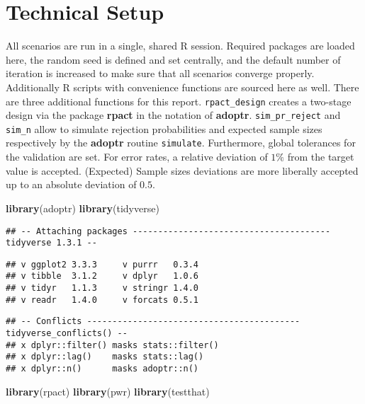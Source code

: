 \documentclass[
]{book}
\newenvironment{Shaded}{\begin{snugshade}}{\end{snugshade}}
\newcommand{\KeywordTok}[1]{\textcolor[rgb]{0.13,0.29,0.53}{\textbf{#1}}}
\newcommand{\NormalTok}[1]{#1}
\begin{document}
\hypertarget{technical-setup}{%
\section{Technical Setup}\label{technical-setup}}

All scenarios are run in a single, shared R session.
Required packages are loaded here,
the random seed is defined and set centrally, and the default number
of iteration is increased to make sure that all scenarios
converge properly.
Additionally R scripts with convenience functions are sourced here as well.
There are three additional functions for this report.
\texttt{rpact\_design} creates a two-stage design via the package \textbf{rpact} \citep{R-rpact}
in the notation of \textbf{adoptr}.
\texttt{sim\_pr\_reject} and \texttt{sim\_n} allow to simulate rejection probabilities
and expected sample sizes respectively by the \textbf{adoptr} routine \texttt{simulate}.
Furthermore, global tolerances for the validation are set.
For error rates, a relative deviation of \(1\%\) from the target value is
accepted.
(Expected) Sample sizes deviations are more liberally accepted up to an
absolute deviation of \(0.5\).

\begin{Shaded}
\begin{Highlighting}[]
\KeywordTok{library}\NormalTok{(adoptr)}
\KeywordTok{library}\NormalTok{(tidyverse)}
\end{Highlighting}
\end{Shaded}

\begin{verbatim}
## -- Attaching packages --------------------------------------- tidyverse 1.3.1 --
\end{verbatim}

\begin{verbatim}
## v ggplot2 3.3.3     v purrr   0.3.4
## v tibble  3.1.2     v dplyr   1.0.6
## v tidyr   1.1.3     v stringr 1.4.0
## v readr   1.4.0     v forcats 0.5.1
\end{verbatim}

\begin{verbatim}
## -- Conflicts ------------------------------------------ tidyverse_conflicts() --
## x dplyr::filter() masks stats::filter()
## x dplyr::lag()    masks stats::lag()
## x dplyr::n()      masks adoptr::n()
\end{verbatim}

\begin{Shaded}
\begin{Highlighting}[]
\KeywordTok{library}\NormalTok{(rpact)}
\KeywordTok{library}\NormalTok{(pwr)}
\KeywordTok{library}\NormalTok{(testthat)}
\end{Highlighting}
\end{Shaded}
\end{document}
